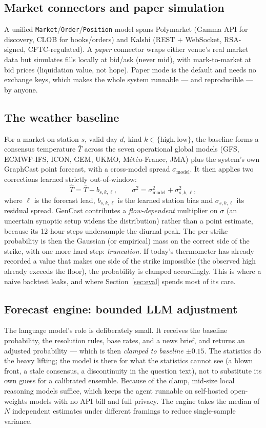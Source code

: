 \documentclass[10pt,twocolumn]{article}
\begin{document}
\subsection{Market connectors and paper simulation}
A unified \texttt{Market}/\texttt{Order}/\texttt{Position} model spans Polymarket
(Gamma API for discovery, CLOB for books/orders) and Kalshi (REST $+$ WebSocket,
RSA-signed, CFTC-regulated). A \emph{paper} connector wraps either venue's real
market data but simulates fills locally at bid/ask (never mid), with
mark-to-market at bid prices (liquidation value, not hope). Paper mode is the
default and needs no exchange keys, which makes the whole system runnable ---
and reproducible --- by anyone.

\subsection{The weather baseline}
For a market on station $s$, valid day $d$, kind $k\in\{\text{high},\text{low}\}$,
the baseline forms a consensus temperature $\bar{T}$ across the seven operational
global models (GFS, ECMWF-IFS, ICON, GEM, UKMO, M\'et\'eo-France, JMA) plus the
system's own GraphCast point forecast, with a cross-model spread $\sigma_{\text{model}}$.
It then applies two corrections learned strictly out-of-window:
\[
\hat{T} = \bar{T} + b_{s,k,\ell}, \qquad
\sigma^2 = \sigma_{\text{model}}^2 + \sigma_{s,k,\ell}^2 ,
\]
where $\ell$ is the forecast lead, $b_{s,k,\ell}$ is the learned station bias and
$\sigma_{s,k,\ell}$ its residual spread. GenCast contributes a
\emph{flow-dependent} multiplier on $\sigma$ (an uncertain synoptic setup widens
the distribution) rather than a point estimate, because its 12-hour steps
undersample the diurnal peak. The per-strike probability is then the Gaussian (or
empirical) mass on the correct side of the strike, with one more hard step:
\emph{truncation}. If today's thermometer has already recorded a value that makes
one side of the strike impossible (the observed high already exceeds the floor),
the probability is clamped accordingly. This is where a naive backtest leaks, and
where Section~\ref{sec:eval} spends most of its care.

\subsection{Forecast engine: bounded LLM adjustment}
The language model's role is deliberately small. It receives the baseline
probability, the resolution rules, base rates, and a news brief, and returns an
adjusted probability --- which is then \emph{clamped to baseline $\pm 0.15$}. The
statistics do the heavy lifting; the model is there for what the statistics
cannot see (a blown front, a stale consensus, a discontinuity in the question
text), not to substitute its own guess for a calibrated ensemble. Because of the
clamp, mid-size local reasoning models suffice, which keeps the agent runnable on
self-hosted open-weights models with no API bill and full privacy. The engine
takes the median of $N$ independent estimates under different framings to reduce
single-sample variance.
\end{document}
